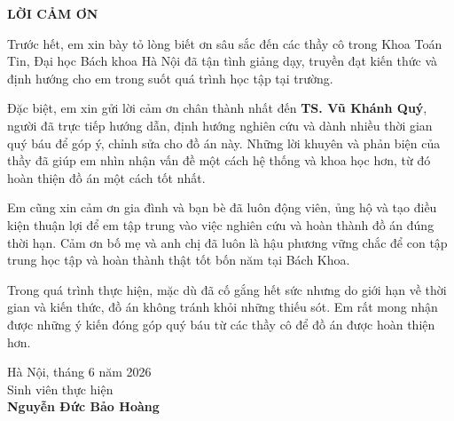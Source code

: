 \documentclass[../DoAn.tex]{subfiles}
\begin{document}
\begin{center}
    \Large{\textbf{LỜI CẢM ƠN}}\\
\end{center}
\vspace{1cm}

Trước hết, em xin bày tỏ lòng biết ơn sâu sắc đến các thầy cô trong Khoa Toán Tin, Đại học Bách khoa Hà Nội đã tận tình giảng dạy, truyền đạt kiến thức và định hướng cho em trong suốt quá trình học tập tại trường.

Đặc biệt, em xin gửi lời cảm ơn chân thành nhất đến \textbf{TS. Vũ Khánh Quý}, người đã trực tiếp hướng dẫn, định hướng nghiên cứu và dành nhiều thời gian quý báu để góp ý, chỉnh sửa cho đồ án này. Những lời khuyên và phản biện của thầy đã giúp em nhìn nhận vấn đề một cách hệ thống và khoa học hơn, từ đó hoàn thiện đồ án một cách tốt nhất.

Em cũng xin cảm ơn gia đình và bạn bè đã luôn động viên, ủng hộ và tạo điều kiện thuận lợi để em tập trung vào việc nghiên cứu và hoàn thành đồ án đúng thời hạn. Cảm ơn bố mẹ và anh chị đã luôn là hậu phương vững chắc để con tập trung học tập và hoàn thành thật tốt bốn năm tại Bách Khoa.

Trong quá trình thực hiện, mặc dù đã cố gắng hết sức nhưng do giới hạn về thời gian và kiến thức, đồ án không tránh khỏi những thiếu sót. Em rất mong nhận được những ý kiến đóng góp quý báu từ các thầy cô để đồ án được hoàn thiện hơn.

\vspace{1cm}
\begin{flushright}
Hà Nội, tháng 6 năm 2026\\
Sinh viên thực hiện\\
\textbf{Nguyễn Đức Bảo Hoàng}
\end{flushright}
\end{document}
